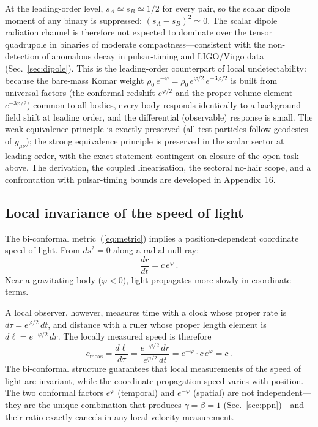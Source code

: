 \documentclass[aps,prd,onecolumn,superscriptaddress,nofootinbib,showpacs,12pt]{revtex4-2}
\begin{document}
At the leading-order level, $s_{A} \simeq s_{B} \simeq
1/2$ for every pair, so the scalar dipole moment of
any binary is suppressed: $(s_{A}-s_{B})^{2} \simeq 0$.
The scalar dipole radiation channel is therefore not
expected to dominate over the tensor quadrupole in
binaries of moderate compactness---consistent with the
non-detection of anomalous decay in pulsar-timing and
LIGO/Virgo data (Sec.~\ref{sec:dipole}).  This is the
leading-order counterpart of local undetectability:
because the bare-mass Komar weight
$\rho_0\,e^{-\varphi}=\rho_0\,e^{\varphi/2}\,e^{-3\varphi/2}$
is built from universal factors (the conformal redshift
$e^{\varphi/2}$ and the proper-volume element
$e^{-3\varphi/2}$) common to all bodies, every body
responds identically to a background field shift at
leading order, and the differential (observable) response
is small.  The weak equivalence principle is exactly
preserved (all test particles follow geodesics of
$g_{\mu\nu}$); the strong equivalence principle is
preserved in the scalar sector at leading order, with
the exact statement contingent on closure of the open
task above.
The derivation, the coupled linearisation, the
sectoral no-hair scope, and a confrontation with
pulsar-timing bounds are developed in Appendix~16.

\subsection{Local invariance of the speed of light}
\label{sec:c_invariance}

The bi-conformal metric~(\ref{eq:metric}) implies a
position-dependent coordinate speed of light.
From $ds^{2} = 0$ along a radial null ray:
\begin{equation}\label{eq:c_coord}
  \frac{dr}{dt} = c\,e^{\varphi}\,.
\end{equation}
Near a gravitating body ($\varphi < 0$), light propagates
more slowly in coordinate terms.

A local observer, however, measures time with a clock
whose proper rate is $d\tau = e^{\varphi/2}\,dt$, and
distance with a ruler whose proper length element is
$d\ell = e^{-\varphi/2}\,dr$.  The locally measured
speed is therefore
\begin{equation}\label{eq:c_local_meas}
  c_{\mathrm{meas}}
  = \frac{d\ell}{d\tau}
  = \frac{e^{-\varphi/2}\,dr}{e^{\varphi/2}\,dt}
  = e^{-\varphi}\cdot c\,e^{\varphi}
  = c\,.
\end{equation}
The bi-conformal structure guarantees that local
measurements of the speed of light are invariant, while
the coordinate propagation speed varies with position.
The two conformal factors $e^{\varphi}$ (temporal) and
$e^{-\varphi}$ (spatial) are not independent---they are
the unique combination that produces
$\gamma = \beta = 1$ (Sec.~\ref{sec:ppn})---and their
ratio exactly cancels in any local velocity measurement.
\end{document}
